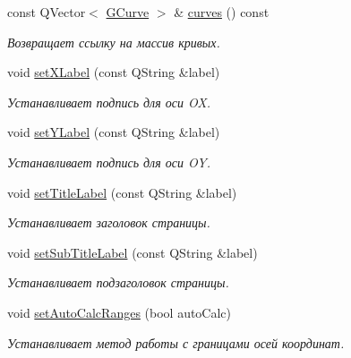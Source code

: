 \begin{DoxyCompactItemize}
const Q\+Vector$<$ \hyperlink{struct_g_curve}{G\+Curve} $>$ \& \hyperlink{class_graph_sheet_a31e3bbc91be8169bf5014601cea0cf54}{curves} () const
\begin{DoxyCompactList}\small\item\em Возвращает ссылку на массив кривых. \end{DoxyCompactList}\item 
\hypertarget{class_graph_sheet_a621fe5716930326ee98375236b20522f}{}\label{class_graph_sheet_a621fe5716930326ee98375236b20522f} 
void \hyperlink{class_graph_sheet_a621fe5716930326ee98375236b20522f}{set\+X\+Label} (const Q\+String \&label)
\begin{DoxyCompactList}\small\item\em Устанавливает подпись для оси OX. \end{DoxyCompactList}\item 
\hypertarget{class_graph_sheet_a121f2bf52435af3924a5fe813456638e}{}\label{class_graph_sheet_a121f2bf52435af3924a5fe813456638e} 
void \hyperlink{class_graph_sheet_a121f2bf52435af3924a5fe813456638e}{set\+Y\+Label} (const Q\+String \&label)
\begin{DoxyCompactList}\small\item\em Устанавливает подпись для оси OY. \end{DoxyCompactList}\item 
\hypertarget{class_graph_sheet_abd3f11230cf41fa15df2c86ad630cbd0}{}\label{class_graph_sheet_abd3f11230cf41fa15df2c86ad630cbd0} 
void \hyperlink{class_graph_sheet_abd3f11230cf41fa15df2c86ad630cbd0}{set\+Title\+Label} (const Q\+String \&label)
\begin{DoxyCompactList}\small\item\em Устанавливает заголовок страницы. \end{DoxyCompactList}\item 
\hypertarget{class_graph_sheet_a0ecbf848f6d821e9fd5b6806c88a178c}{}\label{class_graph_sheet_a0ecbf848f6d821e9fd5b6806c88a178c} 
void \hyperlink{class_graph_sheet_a0ecbf848f6d821e9fd5b6806c88a178c}{set\+Sub\+Title\+Label} (const Q\+String \&label)
\begin{DoxyCompactList}\small\item\em Устанавливает подзаголовок страницы. \end{DoxyCompactList}\item 
void \hyperlink{class_graph_sheet_a5ac1eac707300dc2e8d856e49bd797f3}{set\+Auto\+Calc\+Ranges} (bool auto\+Calc)
\begin{DoxyCompactList}\small\item\em Устанавливает метод работы с границами осей координат. \end{DoxyCompactList}\item 

\end{DoxyCompactItemize}
